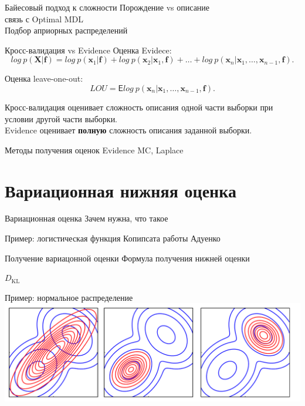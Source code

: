 \documentclass[10pt,pdf,utf8,russian,aspectratio=169]{beamer}
\begin{document}
\begin{frame}{Байесовый подход к сложности}
Порождение vs описание\\
связь с Optimal MDL\\
Подбор априорных распределений
\end{frame}

\begin{frame}{Кросс-валидация vs Evidence}
Оценка Evidece:
\[
log~p(\mathbf{X}|\mathbf{f}) = log~p(\mathbf{x}_1|\mathbf{f}) + log~p(\mathbf{x}_2|\mathbf{x}_1, \mathbf{f}) + \dots +  log~p(\mathbf{x}_n|\mathbf{x}_1,\dots,\mathbf{x}_{n-1}, \mathbf{f}).
\]

Оценка leave-one-out:
\[
LOU = \mathsf{E} log~p(\mathbf{x}_n|\mathbf{x}_1,\dots,\mathbf{x}_{n-1}, \mathbf{f}).
\]

Кросс-валидация оценивает сложность описания одной части выборки при условии другой части выборки. \\
Evidence оценивает \textbf{полную} сложность описания заданной выборки.
\end{frame}

\begin{frame}{Методы получения оценок Evidence}
MC, Laplace
\end{frame}

\section{Вариационная нижняя оценка}
\begin{frame}{Вариационная оценка}
Зачем нужна, что такое
\end{frame}

\begin{frame}{Пример: логистическая функция}
Копипсата работы Адуенко
\end{frame}

\begin{frame}{Получение вариацонной оценки}
Формула получения нижней оценки
\end{frame}

\begin{frame}{$D_\text{KL}$}

\end{frame}

\begin{frame}{Пример: нормальное распределение}
\includegraphics[width=\textwidth]{bishop.png}
\end{frame}
\end{document}
